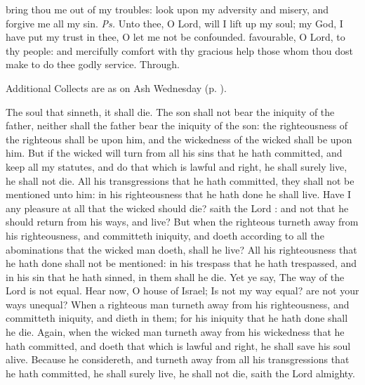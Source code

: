 \introit
{} bring thou me out of my troubles: look upon my adversity and misery, and forgive me all my sin. \textit{Ps.} Unto thee, O Lord, will I lift up my soul; my God, I have put my trust in thee, O let me not be confounded.
\collect
{} favourable, O Lord, to thy people: and mercifully comfort with thy gracious help those whom thou dost make to do thee godly service. Through.
\begin{rubric}
    Additional Collects are as on Ash Wednesday (p. \pageref{AshWednesdayMass}).
\end{rubric}
 The soul that sinneth, it shall die. The son shall not bear the iniquity of the father, neither shall the father bear the iniquity of the son: the righteousness of the righteous shall be upon him, and the wickedness of the wicked shall be upon him. But if the wicked will turn from all his sins that he hath committed, and keep all my statutes, and do that which is lawful and right, he shall surely live, he shall not die. All his transgressions that he hath committed, they shall not be mentioned unto him: in his righteousness that he hath done he shall live. Have I any pleasure at all that the wicked should die? saith the Lord : and not that he should return from his ways, and live? But when the righteous turneth away from his righteousness, and committeth iniquity, and doeth according to all the abominations that the wicked man doeth, shall he live? All his righteousness that he hath done shall not be mentioned: in his trespass that he hath trespassed, and in his sin that he hath sinned, in them shall he die. Yet ye say, The way of the Lord is not equal. Hear now, O house of Israel; Is not my way equal? are not your ways unequal? When a righteous man turneth away from his righteousness, and committeth iniquity, and dieth in them; for his iniquity that he hath done shall he die. Again, when the wicked man turneth away from his wickedness that he hath committed, and doeth that which is lawful and right, he shall save his soul alive. Because he considereth, and turneth away from all his transgressions that he hath committed, he shall surely live, he shall not die, saith the Lord almighty.
